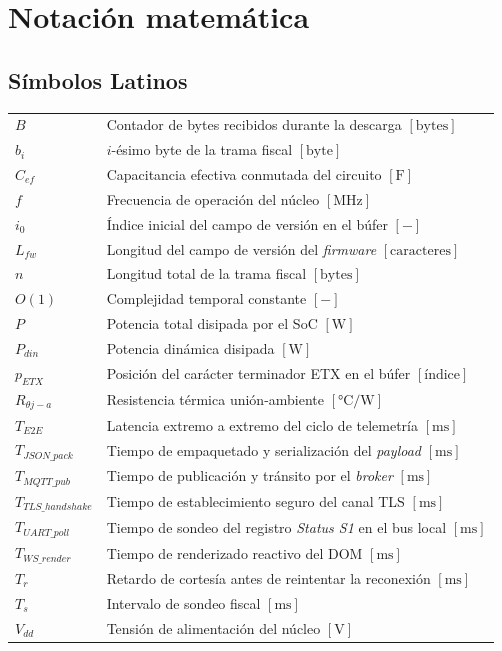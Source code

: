 \chapter*{Notación matemática}

\section*{Símbolos Latinos}
\begin{tabular}{@{}l@{\hspace{1.5em}}p{}@{}}
$B$ & Contador de bytes recibidos durante la descarga $[\text{bytes}]$ \\
$b_i$ & $i$-ésimo byte de la trama fiscal $[\text{byte}]$ \\
$C_{ef}$ & Capacitancia efectiva conmutada del circuito $[\text{F}]$ \\
$f$ & Frecuencia de operación del núcleo $[\text{MHz}]$ \\
$i_0$ & Índice inicial del campo de versión en el búfer $[-]$ \\
$L_{fw}$ & Longitud del campo de versión del \textit{firmware} $[\text{caracteres}]$ \\
$n$ & Longitud total de la trama fiscal $[\text{bytes}]$ \\
$O(1)$ & Complejidad temporal constante $[-]$ \\
$P$ & Potencia total disipada por el SoC $[\text{W}]$ \\
$P_{din}$ & Potencia dinámica disipada $[\text{W}]$ \\
$p_{ETX}$ & Posición del carácter terminador ETX en el búfer $[\text{índice}]$ \\
$R_{\theta j-a}$ & Resistencia térmica unión-ambiente $[\text{°C/W}]$ \\
$T_{E2E}$ & Latencia extremo a extremo del ciclo de telemetría $[\text{ms}]$ \\
$T_{JSON\_pack}$ & Tiempo de empaquetado y serialización del \textit{payload} $[\text{ms}]$ \\
$T_{MQTT\_pub}$ & Tiempo de publicación y tránsito por el \textit{broker} $[\text{ms}]$ \\
$T_{TLS\_handshake}$ & Tiempo de establecimiento seguro del canal TLS $[\text{ms}]$ \\
$T_{UART\_poll}$ & Tiempo de sondeo del registro \textit{Status S1} en el bus local $[\text{ms}]$ \\
$T_{WS\_render}$ & Tiempo de renderizado reactivo del DOM $[\text{ms}]$ \\
$T_{r}$ & Retardo de cortesía antes de reintentar la reconexión $[\text{ms}]$ \\
$T_{s}$ & Intervalo de sondeo fiscal $[\text{ms}]$ \\
$V_{dd}$ & Tensión de alimentación del núcleo $[\text{V}]$ \\
\end{tabular}

